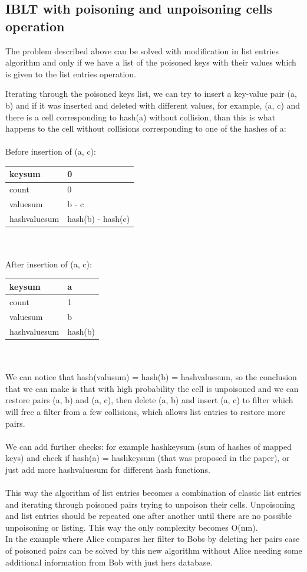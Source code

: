 \documentclass{article}
\begin{document}
\subsection{IBLT with poisoning and unpoisoning cells operation}

The problem described above can be solved with modification in list entries 
algorithm and only if we have a list of the poisoned keys with their values which
is given to the list entries operation. 

Iterating through the poisoned keys list, we can try to insert a key-value pair
(a, b) and if it was inserted and deleted with different values, for example, 
(a, c) and there is a cell corresponding to hash(a) without collision, than this
is what happens to the cell without collisions corresponding to one of the hashes 
of a:
\\ \\ 
Before insertion of (a, c):
\begin{tabular}{l | l}
    keysum & 0 \\ \hline
    count & 0 \\ \hline
    valuesum & b - c \\ \hline
    hashvaluesum & hash(b) - hash(c) \\
\end{tabular}
\\ \\

After insertion of (a, c): \ \
\begin{tabular}{l | l}
    keysum & a \\ \hline
    count & 1 \\ \hline
    valuesum & b \\ \hline
    hashvaluesum & hash(b) \\
\end{tabular}
\\ \\
We can notice that hash(valusum) = hash(b) = hashvaluesum, so the conclusion 
that we can make is that with high probability the cell is unpoisoned and we can
restore pairs (a, b) and (a, c), then delete (a, b) and insert (a, c) to filter
which will free a filter from a few collisions, which allows list entries to 
restore more pairs. 
\\ \\
We can add further checks: for example hashkeysum (sum of hashes of mapped keys)
and check if hash(a) = hashkeysum (that was proposed in the paper), or just add 
more hashvaluesum for different hash functions.
\\ \\
This way the algorithm of list entries becomes a combination of classic list entries
and iterating through poisoned pairs trying to unpoison their cells. Unpoisoning 
and list entries should be repeated one after another until there are no possible 
unpoisoning or listing.
This way the only complexity becomes O(nm). 
\\
In the example where Alice compares her filter to Bobs by deleting her pairs 
case of poisoned pairs can be solved by this new algorithm without Alice needing
some additional information from Bob with just hers database.
\end{document}
